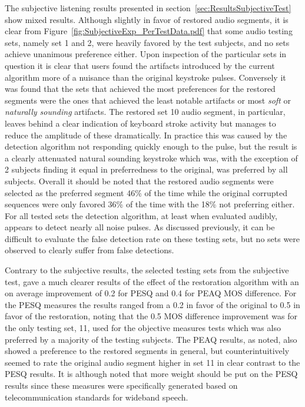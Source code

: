 The subjective listening results presented in section~\ref{sec:ResultsSubjectiveTest} show mixed results. Although slightly in favor of restored audio segments, it is clear from Figure~\ref{fig:SubjectiveExp_PerTestData.pdf} that some audio testing sets, namely set 1 and 2, were heavily favored by the test subjects, and no sets achieve unanimous preference either. Upon inspection of the particular sets in question it is clear that users found the artifacts introduced by the current algorithm more of a nuisance than the original keystroke pulses. Conversely it was found that the sets that achieved the most preferences for the restored segments were the ones that achieved the least notable artifacts or most \emph{soft} or \emph{naturally sounding} artifacts. The restored set 10 audio segment, in particular, leaves behind a clear indication of keyboard stroke activity but manages to reduce the amplitude of these dramatically. In practice this was caused by the detection algorithm not responding quickly enough to the pulse, but the result is a clearly attenuated natural sounding keystroke which was, with the exception of 2 subjects finding it equal in preferredness to the original, was preferred by all subjects. Overall it should be noted that the restored audio segments were selected as the preferred segment 46\% of the time while the original corrupted sequences were only favored 36\% of the time with the 18\% not preferring either. For all tested sets the detection algorithm, at least when evaluated audibly, appears to detect nearly all noise pulses. As discussed previously, it can be difficult to evaluate the false detection rate on these testing sets, but no sets were observed to clearly suffer from false detections.


Contrary to the subjective results, the selected testing sets from the subjective test, gave a much clearer results of the effect of the restoration algorithm with an on average improvement of 0.2 for PESQ and 0.4 for PEAQ MOS difference. For the PESQ measures the results ranged from a 0.2 in favor of the original to 0.5 in favor of the restoration, noting that the 0.5 MOS difference improvement was for the only testing set, 11, used for the objective measures tests which was also preferred by a majority of the testing subjects. The PEAQ results, as noted, also showed a preference to the restored segments in general, but counterintuitively seemed to rate the original audio segment higher in set 11 in clear contrast to the PESQ results. It is although noted that more weight should be put on the PESQ results since these measures were specifically generated based on telecommunication standards for wideband speech.

